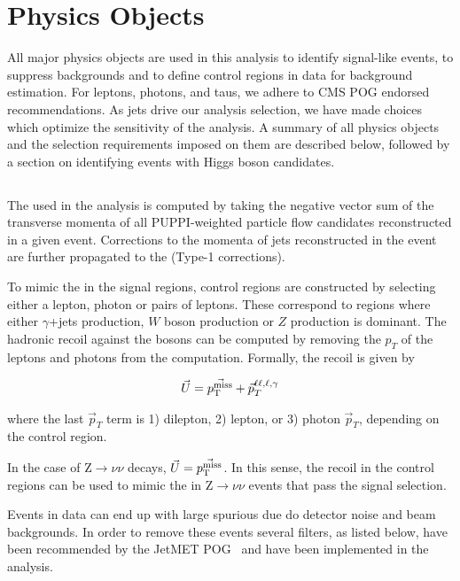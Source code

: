 \clearpage
\section{Physics Objects}
All major physics objects are used in this analysis to identify
signal-like events, to suppress backgrounds and to define control
regions in data for background estimation.  For leptons, photons, and taus, we
adhere to CMS POG endorsed recommendations. 
As jets drive our analysis selection, we have made choices which optimize the sensitivity of the analysis.
A summary of all physics objects and the selection requirements imposed on them are described below, followed by a section on identifying events with Higgs boson candidates. 

\subsection{\MET}\label{subsec:MET}
The \MET used in the analysis is computed by taking the negative vector sum of the transverse momenta of all PUPPI-weighted particle flow candidates reconstructed in a given event.
Corrections to the momenta of jets reconstructed in the event are further propagated to the \MET (Type-1 corrections).

To mimic the \MET in the signal regions, control regions are constructed by selecting either a lepton, photon or pairs of
leptons. These correspond to regions where either $\gamma$+jets production, $W$ boson production or $Z$ production is dominant.
The hadronic recoil against the bosons can be computed by removing the $p_T$ of the leptons and photons from the \MET computation.
Formally, the recoil is given by

\begin{gather}
  \vec{U} = \vec{p_{\mathrm{T}}^{\text{miss}}} + \vec{p}_{T}^{\ell\ell,\ell,\gamma}
\end{gather}

where the last $\vec{p}_T$ term is 1) dilepton, 2) lepton, or 3) photon $\vec{p}_T$, depending on the control region.

In the case of Z$\rightarrow\nu\nu$ decays, $\vec{U}=\vec{p_{\mathrm{T}}^{\text{miss}}}$. In this sense, the recoil in the control regions
can be used to mimic the \MET in Z$\rightarrow\nu\nu$ events that pass the signal selection.

Events in data can end up with large spurious \MET due do detector noise and beam backgrounds. In order to remove these events several \MET filters, as listed below, 
have been recommended by the JetMET POG~\cite{METFILTERS_TWIKI} and have been implemented in the analysis.

